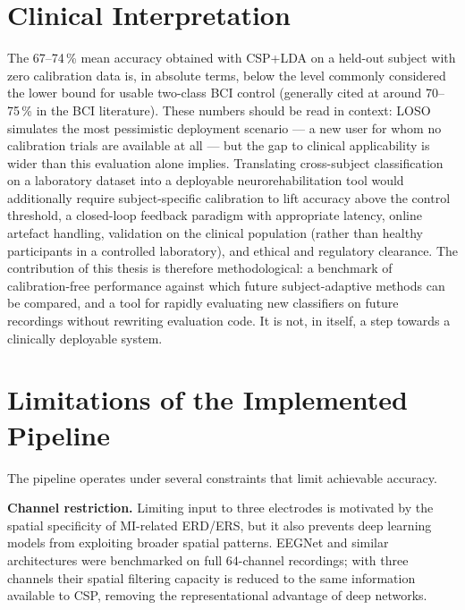 \documentclass[english, bc, kiv, he, iso690alph, pdf]{fasthesis}
\begin{document}
\section{Clinical Interpretation}

The 67--74\,\% mean accuracy obtained with CSP+LDA on a held-out subject with zero calibration data is, in absolute terms, below the level commonly considered the lower bound for usable two-class BCI control (generally cited at around 70--75\,\% in the BCI literature). These numbers should be read in context: LOSO simulates the most pessimistic deployment scenario --- a new user for whom no calibration trials are available at all --- but the gap to clinical applicability is wider than this evaluation alone implies. Translating cross-subject classification on a laboratory dataset into a deployable neurorehabilitation tool would additionally require subject-specific calibration to lift accuracy above the control threshold, a closed-loop feedback paradigm with appropriate latency, online artefact handling, validation on the clinical population (rather than healthy participants in a controlled laboratory), and ethical and regulatory clearance. The contribution of this thesis is therefore methodological: a benchmark of calibration-free performance against which future subject-adaptive methods can be compared, and a tool for rapidly evaluating new classifiers on future recordings without rewriting evaluation code. It is not, in itself, a step towards a clinically deployable system.

\section{Limitations of the Implemented Pipeline}

The pipeline operates under several constraints that limit achievable accuracy.

\textbf{Channel restriction.} Limiting input to three electrodes is motivated by the spatial specificity of MI-related ERD/ERS, but it also prevents deep learning models from exploiting broader spatial patterns. EEGNet and similar architectures were benchmarked on full 64-channel recordings; with three channels their spatial filtering capacity is reduced to the same information available to CSP, removing the representational advantage of deep networks.
\end{document}
